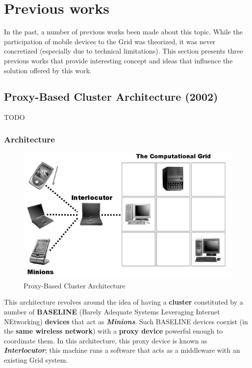 \section{Previous works}
In the past, a number of previous works been made about this topic. While the participation of mobile devices to the Grid was theorized, it was never concretized (especially due to technical limitations). This section presents three previous works that provide interesting concept and ideas that influence the solution offered by this work.

\subsection{Proxy-Based Cluster Architecture (2002)}
TODO

\subsubsection{Architecture}
\begin{figure}[H]
    \centering
    \includegraphics[scale=0.8]{document/chapters/chapter_3/images/2002_architecture.png}
    \caption{Proxy-Based Cluster Architecture \cite{integrating_mobile_devices_into_grid}}
    \label{fig:2002_architecture}
\end{figure}
This architecture revolves around the idea of having a \textbf{cluster} constituted by a number of \textbf{BASELINE} (Barely Adequate Systems Leveraging Internet NEtworking) \textbf{devices} that act as \textbf{\textit{Minions}}. Such BASELINE devices coexist (in the \textbf{same wireless network}) with a \textbf{proxy device} powerful enough to coordinate them. In this architecture, this proxy device is known as \textbf{\textit{Interlocutor}}; this machine runs a software that acts as a middleware with an existing Grid system.

